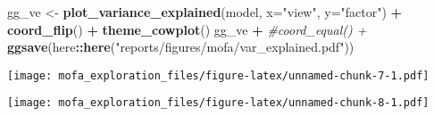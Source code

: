 \documentclass[
]{article}
\newenvironment{Shaded}{\begin{snugshade}}{\end{snugshade}}
\newcommand{\CommentTok}[1]{\textcolor[rgb]{0.56,0.35,0.01}{\textit{#1}}}
\newcommand{\DataTypeTok}[1]{\textcolor[rgb]{0.13,0.29,0.53}{#1}}
\newcommand{\DecValTok}[1]{\textcolor[rgb]{0.00,0.00,0.81}{#1}}
\newcommand{\KeywordTok}[1]{\textcolor[rgb]{0.13,0.29,0.53}{\textbf{#1}}}
\newcommand{\NormalTok}[1]{#1}
\newcommand{\OperatorTok}[1]{\textcolor[rgb]{0.81,0.36,0.00}{\textbf{#1}}}
\newcommand{\StringTok}[1]{\textcolor[rgb]{0.31,0.60,0.02}{#1}}
\begin{document}
\begin{Shaded}
\begin{Highlighting}[]
\NormalTok{gg_ve <-}\StringTok{ }\KeywordTok{plot_variance_explained}\NormalTok{(model, }\DataTypeTok{x=}\StringTok{"view"}\NormalTok{, }\DataTypeTok{y=}\StringTok{"factor"}\NormalTok{) }\OperatorTok{+}\StringTok{ }\KeywordTok{coord_flip}\NormalTok{() }\OperatorTok{+}
\StringTok{  }\KeywordTok{theme_cowplot}\NormalTok{() }
\NormalTok{gg_ve  }\OperatorTok{+}\StringTok{ }
\StringTok{  }\CommentTok{#coord_equal() +}
\StringTok{  }\KeywordTok{ggsave}\NormalTok{(here}\OperatorTok{::}\KeywordTok{here}\NormalTok{(}\StringTok{"reports/figures/mofa/var_explained.pdf"}\NormalTok{))}
\end{Highlighting}
\end{Shaded}

\texttt{[image: mofa\_exploration\_files/figure-latex/unnamed-chunk-7-1.pdf]}

\begin{Shaded}
\end{Shaded}

\texttt{[image: mofa\_exploration\_files/figure-latex/unnamed-chunk-8-1.pdf]}

\begin{Shaded}
\end{Shaded}
\end{document}
